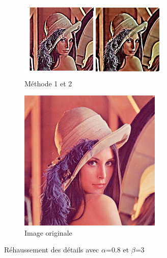 \documentclass[twoside,UTF8]{EPURapport}
\begin{document}
\begin{figure}
        \centering
        \begin{subfigure}[b]{0.3\textwidth}
                \includegraphics[]{images/lena_08_3.png} 
                \caption{Méthode 1 et 2}
        \end{subfigure}
        
        \begin{subfigure}[b]{0.3\textwidth}
                \includegraphics[scale=0.5]{images/lena.jpg}
             	\caption{Image originale}
        \end{subfigure}
        \caption{Réhaussement des détails avec $\alpha$=0.8 et $\beta$=3}
\end{figure}
\end{document}
